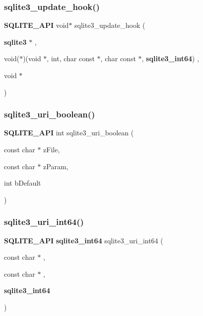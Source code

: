 \mbox{\label{sqlite3_8h_acd8c5cbceb5a693542dd585f69dff56c}} 
\subsubsection{sqlite3\_update\_hook()}
{\footnotesize\ttfamily \textbf{ S\+Q\+L\+I\+T\+E\+\_\+\+A\+PI} void$\ast$ sqlite3\+\_\+update\+\_\+hook (\begin{DoxyParamCaption}\item[{\textbf{ sqlite3} $\ast$}]{,  }\item[{void($\ast$)(void $\ast$, int, char const $\ast$, char const $\ast$, \textbf{ sqlite3\+\_\+int64})}]{,  }\item[{void $\ast$}]{ }\end{DoxyParamCaption})}

\mbox{\label{sqlite3_8h_a1124cc9034bdbc616bb6d54455a4110f}} 
\subsubsection{sqlite3\_uri\_boolean()}
{\footnotesize\ttfamily \textbf{ S\+Q\+L\+I\+T\+E\+\_\+\+A\+PI} int sqlite3\+\_\+uri\+\_\+boolean (\begin{DoxyParamCaption}\item[{const char $\ast$}]{z\+File,  }\item[{const char $\ast$}]{z\+Param,  }\item[{int}]{b\+Default }\end{DoxyParamCaption})}

\mbox{\label{sqlite3_8h_a86516373b17f3928036fb6926e04683d}} 
\subsubsection{sqlite3\_uri\_int64()}
{\footnotesize\ttfamily \textbf{ S\+Q\+L\+I\+T\+E\+\_\+\+A\+PI} \textbf{ sqlite3\+\_\+int64} sqlite3\+\_\+uri\+\_\+int64 (\begin{DoxyParamCaption}\item[{const char $\ast$}]{,  }\item[{const char $\ast$}]{,  }\item[{\textbf{ sqlite3\+\_\+int64}}]{ }\end{DoxyParamCaption})}

